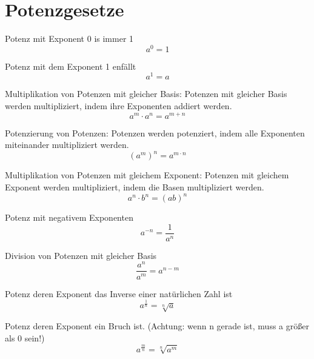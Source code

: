 \documentclass[11pt]{article}
\begin{document}
\section{Potenzgesetze}


Potenz mit Exponent 0 is immer 1
$$ a^{0} = 1 $$

Potenz mit dem Exponent 1 enfällt
$$ a^{1} = a $$ 

Multiplikation von Potenzen mit gleicher Basis: Potenzen mit gleicher Basis werden multipliziert, indem ihre Exponenten addiert werden.
$$ a^{m} \cdot a^{n} = a^{m+n} $$

Potenzierung von Potenzen: Potenzen werden potenziert, indem alle Exponenten miteinander multipliziert werden.
$$ (a^{m})^{n} = a^{m \cdot n} $$

Multiplikation von Potenzen mit gleichem Exponent: Potenzen mit gleichem Exponent werden multipliziert, indem die Basen multipliziert werden.
$$ a^{n} \cdot b^{n} = (ab)^{n} $$

Potenz mit negativem Exponenten
$$ a^{-n} = \frac{1}{a^{n}}$$

Division von Potenzen mit gleicher Basis
$$ \frac{a^{n}}{a^{m}} = a^{n-m} $$ 

Potenz deren Exponent das Inverse einer natürlichen Zahl ist
$$ a^{\frac{1}{n}} = \sqrt[n]{a}$$

Potenz deren Exponent ein Bruch ist. (Achtung: wenn n gerade ist, muss a größer als 0 sein!)
$$ a^{\frac{m}{n}} = \sqrt[n]{a^{m}} $$
\end{document}
